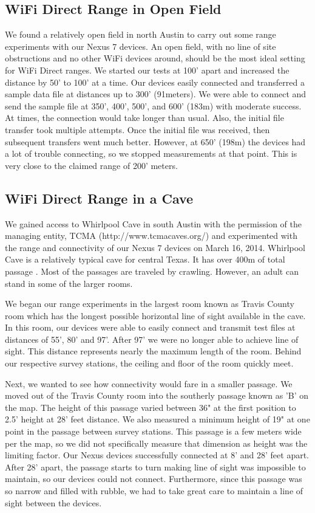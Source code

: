 \documentclass[10pt,twocolumn]{article}
\begin{document}
\subsection{WiFi Direct Range in Open Field}
\label{sec:WiFi Direct Range in Open Field}
We found a relatively open field in north Austin to carry out some range experiments with our Nexus 7 devices.
An open field, with no line of site obstructions and no other WiFi devices around, should be the most ideal setting for WiFi Direct ranges.
We started our tests at 100' apart and increased the distance by 50' to 100' at a time.
Our devices easily connected and transferred a sample data file at distances up to 300' (91meters). 
We were able to connect and send the sample file at 350', 400', 500', and 600' (183m) with moderate success. 
At times, the connection would take longer than usual.
Also, the initial file transfer took multiple attempts.
Once the initial file was received, then subsequent transfers went much better.
However, at 650' (198m) the devices had a lot of trouble connecting, so we stopped measurements at that point.
This is very close to the claimed range of 200' meters.

\subsection{WiFi Direct Range in a Cave}
\label{sec:WiFi Direct Range in a Cave}
We gained access to Whirlpool Cave in south Austin with the permission of the managing entity, TCMA (http://www.tcmacaves.org/) and experimented with the range and connectivity of our Nexus 7 devices on March 16, 2014.
Whirlpool Cave is a relatively typical cave for central Texas.
It has over 400m of total passage \cite{whirlpool}. 
Most of the passages are traveled by crawling.
However, an adult can stand in some of the larger rooms.

We began our range experiments in the largest room known as Travis County room which has the longest possible horizontal line of sight available in the cave.
In this room, our devices were able to easily connect and transmit test files at distances of 55', 80' and 97'. 
After 97' we were no longer able to achieve line of sight.
This distance represents nearly the maximum length of the room. 
Behind our respective survey stations, the ceiling and floor of the room quickly meet.

Next, we wanted to see how connectivity would fare in a smaller passage. 
We moved out of the Travis County room into the southerly passage known as 'B' on the map.
The height of this passage varied between 36" at the first position to 2.5' height at 28' feet distance.
We also measured a minimum height of 19" at one point in the passage between survey stations.
This passage is a few meters wide per the map, so we did not specifically measure that dimension as height was the limiting factor.
Our Nexus devices successfully connected at 8' and 28' feet apart.
After 28' apart, the passage starts to turn making line of sight was impossible to maintain, so our devices could not connect.
Furthermore, since this passage was so narrow and filled with rubble, we had to take great care to maintain a line of sight between the devices.
\end{document}
